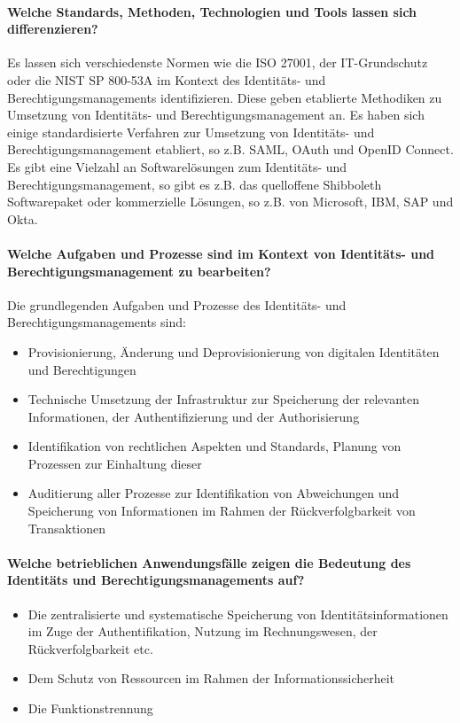 \documentclass[11pt]{article}
\begin{document}
\paragraph{Welche Standards, Methoden, Technologien und Tools lassen sich differenzieren?}
Es lassen sich verschiedenste Normen wie die ISO 27001, der IT-Grundschutz oder die NIST SP 800-53A im Kontext des Identitäts- und Berechtigungsmanagements identifizieren. Diese geben etablierte Methodiken zu Umsetzung von Identitäts- und Berechtigungsmanagement an. Es haben sich einige standardisierte Verfahren zur Umsetzung von Identitäts- und Berechtigungsmanagement etabliert, so z.B. SAML, OAuth und OpenID Connect. Es gibt eine Vielzahl an Softwarelösungen zum Identitäts- und Berechtigungsmanagement, so gibt es z.B. das quelloffene Shibboleth Softwarepaket oder kommerzielle Lösungen, so z.B. von Microsoft, IBM, SAP und Okta.
\paragraph{Welche Aufgaben und Prozesse sind im Kontext von Identitäts- und Berechtigungsmanagement zu bearbeiten?}
Die grundlegenden Aufgaben und Prozesse des Identitäts- und Berechtigungsmanagements sind:
\begin{itemize}
  \item Provisionierung, Änderung und Deprovisionierung von digitalen Identitäten und Berechtigungen
  \item Technische Umsetzung der Infrastruktur zur Speicherung der relevanten Informationen, der Authentifizierung und der Authorisierung
  \item Identifikation von rechtlichen Aspekten und Standards, Planung von Prozessen zur Einhaltung dieser
  \item Auditierung aller Prozesse zur Identifikation von Abweichungen und Speicherung von Informationen im Rahmen der Rückverfolgbarkeit von Transaktionen
\end{itemize}
\paragraph{Welche betrieblichen Anwendungsfälle zeigen die Bedeutung des Identitäts und Berechtigungsmanagements auf?}
\begin{itemize}
  \item Die zentralisierte und systematische Speicherung von Identitätsinformationen im Zuge der Authentifikation, Nutzung im Rechnungswesen, der Rückverfolgbarkeit etc.
  \item Dem Schutz von Ressourcen im Rahmen der Informationssicherheit
  \item Die Funktionstrennung
\end{itemize}
\end{document}
